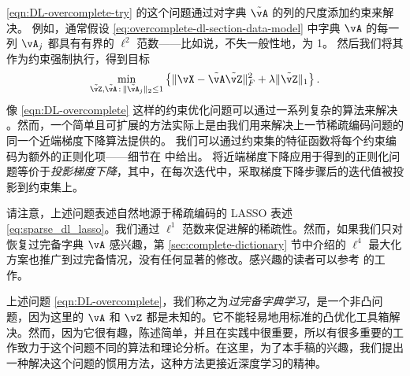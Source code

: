 \documentclass[../../book-main.tex]{subfiles}
\begin{document}
\eqref{eqn:DL-overcomplete-try} 的这个问题通过对字典 $\tilde{\vA}$ 的列的尺度添加约束来解决。
例如，通常假设 \eqref{eq:overcomplete-dl-section-data-model} 中字典 $\vA$ 的每一列 $\vA_j$ 都具有有界的 $\ell^2$ 范数——比如说，不失一般性地，为 1。
然后我们将其作为约束强制执行，得到目标
\begin{equation}
    \min_{\tilde{\vZ}, \tilde{\vA} \,:\, \norm{\tilde{\vA}_j}_2 \leq 1}
    \bc{\norm{\vX - \tilde{\vA}\tilde{\vZ}}_{F}^{2} + \lambda \norm{\tilde{\vZ}}_{1}}.
    \label{eqn:DL-overcomplete}
\end{equation}
像 \eqref{eqn:DL-overcomplete} 这样的约束优化问题可以通过一系列复杂的算法来解决 \cite{nocedal2006numerical}。然而，一个简单且可扩展的方法实际上是由我们用来解决上一节稀疏编码问题的同一个近端梯度下降算法提供的。
我们可以通过约束集的特征函数将每个约束编码为额外的正则化项——细节在  中给出。
将近端梯度下降应用于得到的正则化问题等价于\textit{投影梯度下降}，其中，在每次迭代中，采取梯度下降步骤后的迭代值被投影到约束集上。

\begin{remark}
请注意，上述问题表述自然地源于稀疏编码的 LASSO 表述 \eqref{eq:sparse_dl_lasso}。我们通过 \(\ell^1\) 范数来促进解的稀疏性。然而，如果我们只对恢复过完备字典 \(\vA\) 感兴趣，第 \ref{sec:complete-dictionary} 节中介绍的 \(\ell^4\) 最大化方案也推广到过完备情况，没有任何显著的修改。感兴趣的读者可以参考 \cite{Qu2020Geometric} 的工作。
\end{remark}

上述问题 \eqref{eqn:DL-overcomplete}，我们称之为\textit{过完备字典学习}，是一个非凸问题，因为这里的 \(\vA\) 和 \(\vZ\) 都是未知的。它不能轻易地用标准的凸优化工具箱解决。然而，因为它很有趣，陈述简单，并且在实践中很重要，所以有很多重要的工作致力于这个问题不同的算法和理论分析。在这里，为了本手稿的兴趣，我们提出一种解决这个问题的惯用方法，这种方法更接近深度学习的精神。
\end{document}
